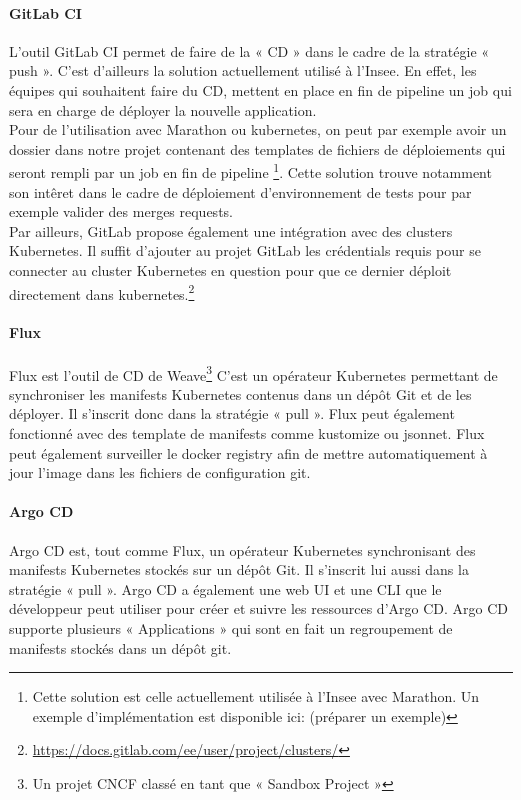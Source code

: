 \documentclass[11pt,fleqn]{book} %
\begin{document}
\paragraph{GitLab CI}
L'outil GitLab CI permet de faire de la « CD » dans le cadre de la stratégie « push ». C’est d'ailleurs la solution actuellement utilisé à l'Insee. En effet, les équipes qui souhaitent faire du CD, mettent en place en fin de pipeline un job qui sera en charge de déployer la nouvelle application.\\
Pour de l'utilisation avec Marathon ou kubernetes, on peut par exemple avoir un dossier dans notre projet contenant des templates de fichiers de déploiements qui seront rempli par un job en fin de pipeline \footnote{Cette solution est celle actuellement utilisée à l'Insee avec Marathon. Un exemple d'implémentation est disponible ici: (préparer un exemple)}. Cette solution trouve notamment son intêret dans le cadre de déploiement d'environnement de tests pour par exemple valider des merges requests.\\
Par ailleurs, GitLab propose également une intégration avec des clusters Kubernetes. Il suffit d’ajouter au projet GitLab les crédentials requis pour se connecter au cluster Kubernetes en question pour que ce dernier déploit directement dans kubernetes.\footnote{\url{https://docs.gitlab.com/ee/user/project/clusters/}}


\paragraph{Flux}
Flux est l’outil de CD de Weave\footnote{Un projet CNCF classé en tant que « Sandbox Project »} C’est un opérateur Kubernetes permettant de synchroniser les manifests Kubernetes contenus dans un dépôt Git et de les déployer. Il s’inscrit donc dans la stratégie « pull ». Flux peut également fonctionné avec des template de manifests comme kustomize ou jsonnet. Flux peut également surveiller le docker registry afin de mettre automatiquement à jour l'image dans les fichiers de configuration git. 

\paragraph{Argo CD}
Argo CD est, tout comme Flux, un opérateur Kubernetes synchronisant des manifests Kubernetes stockés sur un dépôt Git. Il s’inscrit lui aussi dans la stratégie « pull ».  Argo CD a également une web UI et une CLI que le développeur peut utiliser pour créer et suivre les ressources d’Argo CD. Argo CD supporte plusieurs « Applications » qui sont en fait un regroupement de manifests stockés dans un dépôt git.
\end{document}
